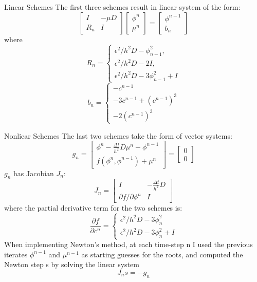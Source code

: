 \documentclass[9pt]{beamer}
\begin{document}
\begin{frame}{Linear Schemes}
The first three schemes result in  linear system of the form:
$$
\left[\begin{array}{cc}
I & -\mu D \\
R_{n} & I
\end{array}\right]\left[\begin{array}{c}
\phi^{n} \\
\mu^{n}
\end{array}\right]=\left[\begin{array}{c}
\phi^{n-1} \\
b_{n}
\end{array}\right]
$$
where
$$
R_{n}=\left\{\begin{array}{l}
\epsilon^{2} / h^{2} D-\phi_{n-1}^{2}, \\
\epsilon^{2} / h^{2} D-2 I, \\
\epsilon^{2} / h^{2} D-3 \phi_{n-1}^{2}+I
\end{array}\right.
$$
$$
b_{n}=\left\{\begin{array}{l}
-c^{n-1} \\
-3 c^{n-1}+\left(c^{n-1}\right)^{3} \\
-2\left(c^{n-1}\right)^{3}
\end{array}\right.
$$
\end{frame}

\begin{frame}{Nonliear Schemes}
The last two schemes take the form of vector systems:
$$
g_{n}=\left[\begin{array}{c}
\phi^{n}- \frac{\Delta t}{h^2} D \mu^{n}-\phi^{n-1} \\
f\left(\phi^{n}, \phi^{n-1}\right)+\mu^{n}
\end{array}\right]=\left[\begin{array}{l}
0 \\
0
\end{array}\right]
$$
$g_n$ has Jacobian $J_n$:
$$
J_{n}=\left[\begin{array}{cc}
I & -\frac{\Delta t}{h^2}  D \\
\partial f / \partial \phi^{n} & I
\end{array}\right]
$$
where the partial derivative term for the two schemes is:
$$
\frac{\partial f}{\partial c^{n}}=\left\{\begin{array}{l}
\epsilon^{2} / h^{2} D-3 \phi_{n}^{2} \\
\epsilon^{2} / h^{2} D-3 \phi_{n}^{2}+I
\end{array}\right.
$$
When implementing Newton’s method, at each time-step n I used the previous iterates $\phi^{n-1}$ and $\mu^{n-1}$ as starting guesses for the roots, and computed the Newton step s by solving the linear system
$$J_ns=-g_n$$
\end{frame}
\end{document}
